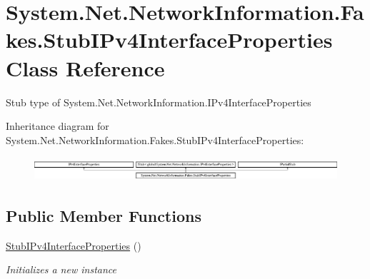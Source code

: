 \hypertarget{class_system_1_1_net_1_1_network_information_1_1_fakes_1_1_stub_i_pv4_interface_properties}{\section{System.\-Net.\-Network\-Information.\-Fakes.\-Stub\-I\-Pv4\-Interface\-Properties Class Reference}
\label{class_system_1_1_net_1_1_network_information_1_1_fakes_1_1_stub_i_pv4_interface_properties}
}


Stub type of System.\-Net.\-Network\-Information.\-I\-Pv4\-Interface\-Properties 


Inheritance diagram for System.\-Net.\-Network\-Information.\-Fakes.\-Stub\-I\-Pv4\-Interface\-Properties\-:\begin{figure}[H]
\begin{center}
\leavevmode
\includegraphics[height=0.884676cm]{class_system_1_1_net_1_1_network_information_1_1_fakes_1_1_stub_i_pv4_interface_properties}
\end{center}
\end{figure}
\subsection*{Public Member Functions}
\begin{DoxyCompactItemize}
\item 
\hyperlink{class_system_1_1_net_1_1_network_information_1_1_fakes_1_1_stub_i_pv4_interface_properties_a0fe933b265bd7a00ebb995b0ffbe6b40}{Stub\-I\-Pv4\-Interface\-Properties} ()
\begin{DoxyCompactList}\small\item\em Initializes a new instance\end{DoxyCompactList}\end{DoxyCompactItemize}
